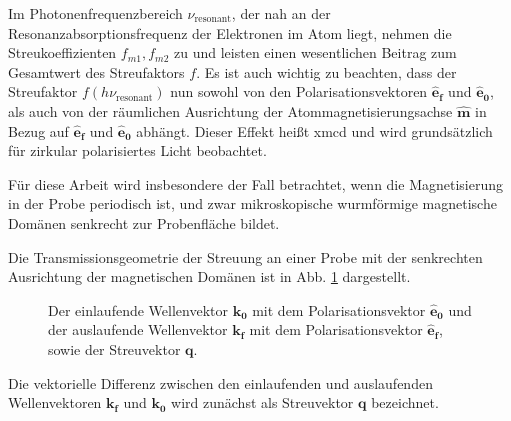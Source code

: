 \noindent
Im Photonenfrequenzbereich $\nu_\text{resonant}$, der nah an der Resonanzabsorptionsfrequenz der Elektronen im Atom liegt, nehmen die Streukoeffizienten $f_{m1}, f_{m2}$ zu und leisten einen wesentlichen Beitrag zum Gesamtwert des Streufaktors $f$. Es ist auch wichtig zu beachten, dass der Streufaktor $f(h\nu_\text{resonant})$ nun sowohl von den Polarisationsvektoren $\mathbf{\hat{e}_f}$ und $\mathbf{\hat{e}_0}$, als auch von der räumlichen Ausrichtung der Atommagnetisierungsachse $\mathbf{\hat{m}}$ in Bezug auf $\mathbf{\hat{e}_f}$ und $\mathbf{\hat{e}_0}$ abhängt. Dieser Effekt heißt \gls{xmcd} und wird grundsätzlich für zirkular polarisiertes Licht beobachtet.

\noindent
Für diese Arbeit wird insbesondere der Fall betrachtet, wenn die Magnetisierung in der Probe periodisch ist, und zwar mikroskopische wurmförmige magnetische Domänen senkrecht zur Probenfläche bildet. %

\noindent
Die Transmissionsgeometrie der Streuung an einer Probe mit der senkrechten Ausrichtung der magnetischen Domänen ist in Abb. \ref{fig:transmission_geometrie} dargestellt.
\begin{figure}[ht]
    \centering
    
    \caption{Der einlaufende Wellenvektor $\mathbf{k_0}$ mit dem Polarisationsvektor $\mathbf{\hat{e}_0}$ und der auslaufende Wellenvektor $\mathbf{k_f}$ mit dem Polarisationsvektor $\mathbf{\hat{e}_f}$, sowie der Streuvektor $\mathbf{q}$.}
    \label{fig:transmission_geometrie}
\end{figure}
Die vektorielle Differenz zwischen den einlaufenden und auslaufenden  Wellenvektoren $\mathbf{k_f}$ und $\mathbf{k_0}$ wird zunächst als Streuvektor $\mathbf{q}$ bezeichnet.

